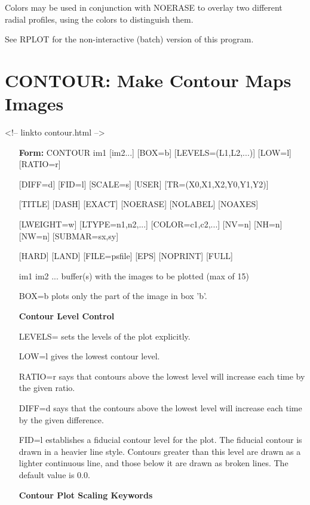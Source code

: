 Colors may be used in conjunction with NOERASE to overlay two different
radial profiles, using the colors to distinguish them.

See RPLOT for the non-interactive (batch) version of this program.

\section{CONTOUR: Make Contour Maps Images}
\begin{rawhtml}
<!-- linkto contour.html -->
\end{rawhtml}
\begin{itemize} 
  \item[\textbf{Form:} CONTOUR im1 {[im2...]} {[BOX=b]} 
       {[LEVELS=(L1,L2,...)]} {[LOW=l]} {[RATIO=r]} ]{}
  \item[{[DIFF=d]} {[FID=l]} {[SCALE=s]} {[USER]} 
        {[TR=(X0,X1,X2,Y0,Y1,Y2)]} ]{}
  \item[{[TITLE]} {[DASH]} {[EXACT]} {[NOERASE]} {[NOLABEL]} {[NOAXES]}]{}
  \item[{[LWEIGHT=w]} {[LTYPE=n1,n2,...]} {[COLOR=c1,c2,...]} {[NV=n]} 
        {[NH=n]} {[NW=n]} {[SUBMAR=sx,sy]}]{}
  \item[{[HARD]} {[LAND]} {[FILE=psfile]} {[EPS]} {[NOPRINT]} {[FULL]} ]{}
  \item[im1 im2 ...]{buffer(s) with the images to be plotted (max of 15)}
  \item[BOX=b]{plots only the part of the image in box 'b'.}
  \item[\textbf{Contour Level Control}\hfill]{}
  \item[LEVELS=]{sets the levels of the plot explicitly.}
  \item[LOW=l]{gives the lowest contour level.}
  \item[RATIO=r]{says that contours above the lowest level will increase
       each time by the given ratio.}
  \item[DIFF=d]{says that the contours above the lowest level will
       increase each time by the given difference.}
  \item[FID=l]{establishes a fiducial contour level for the plot.  The
       fiducial contour is drawn in a heavier line style.
       Contours greater than this level are drawn as a lighter
       continuous line, and those below it are drawn as broken
       lines.  The default value is 0.0.}
  \item[\textbf{Contour Plot Scaling Keywords}\hfill]{}

\end{itemize}
